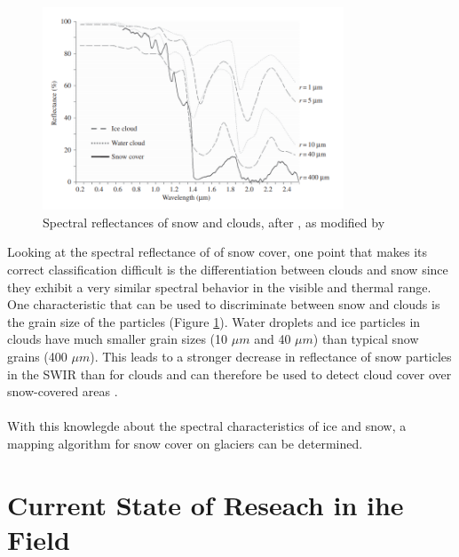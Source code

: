 \documentclass[12pt]{article}
\begin{document}
\begin{figure}
    \includegraphics[width=0.8\textwidth]{dozier_et_al_as_modified_byKoenig_et_al_cloud_reflectance.png}
    \caption{Spectral reflectances of snow and clouds, after \cite{Dozier1989}, as modified by \cite{Dietz2011} }
    \label{fig:reflectance_clouds}
\end{figure}
Looking at the spectral reflectance of of snow cover, one point that makes its correct classification difficult is the  differentiation between clouds and snow since they exhibit a very similar spectral behavior in the visible and thermal range. One characteristic that can be used to discriminate between snow and clouds is the grain size of the particles (Figure \ref{fig:reflectance_clouds}). Water droplets and ice particles in clouds have much smaller grain sizes (10 $\mu m$ and 40 $\mu m$) than typical snow grains (400 $\mu m$). This leads to a stronger decrease in reflectance of snow particles in the SWIR than for clouds and can therefore be used to detect cloud cover over snow-covered areas \cite{Dietz2011}. 
\\
\\
With this knowlegde about the spectral characteristics of ice and snow, a mapping algorithm for snow cover on glaciers can be determined.
 \\



\section{Current State of Reseach in ihe Field}
\end{document}
